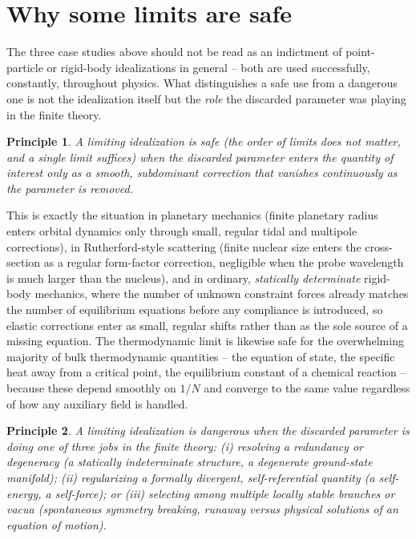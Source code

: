 \documentclass[11pt]{article}
\newtheorem{principle}{Principle}
\begin{document}
\section{Why some limits are safe}

The three case studies above should not be read as an indictment of point-particle or rigid-body idealizations in general -- both are used successfully, constantly, throughout physics. What distinguishes a safe use from a dangerous one is not the idealization itself but the \emph{role} the discarded parameter was playing in the finite theory.

\begin{principle}
A limiting idealization is safe (the order of limits does not matter, and a single limit suffices) when the discarded parameter enters the quantity of interest only as a smooth, subdominant correction that vanishes continuously as the parameter is removed.
\end{principle}

This is exactly the situation in planetary mechanics (finite planetary radius enters orbital dynamics only through small, regular tidal and multipole corrections), in Rutherford-style scattering (finite nuclear size enters the cross-section as a regular form-factor correction, negligible when the probe wavelength is much larger than the nucleus), and in ordinary, \emph{statically determinate} rigid-body mechanics, where the number of unknown constraint forces already matches the number of equilibrium equations before any compliance is introduced, so elastic corrections enter as small, regular shifts rather than as the sole source of a missing equation. The thermodynamic limit is likewise safe for the overwhelming majority of bulk thermodynamic quantities -- the equation of state, the specific heat away from a critical point, the equilibrium constant of a chemical reaction -- because these depend smoothly on $1/N$ and converge to the same value regardless of how any auxiliary field is handled.

\begin{principle}
A limiting idealization is dangerous when the discarded parameter is doing one of three jobs in the finite theory: (i) resolving a redundancy or degeneracy (a statically indeterminate structure, a degenerate ground-state manifold); (ii) regularizing a formally divergent, self-referential quantity (a self-energy, a self-force); or (iii) selecting among multiple locally stable branches or vacua (spontaneous symmetry breaking, runaway versus physical solutions of an equation of motion).
\end{principle}
\end{document}
